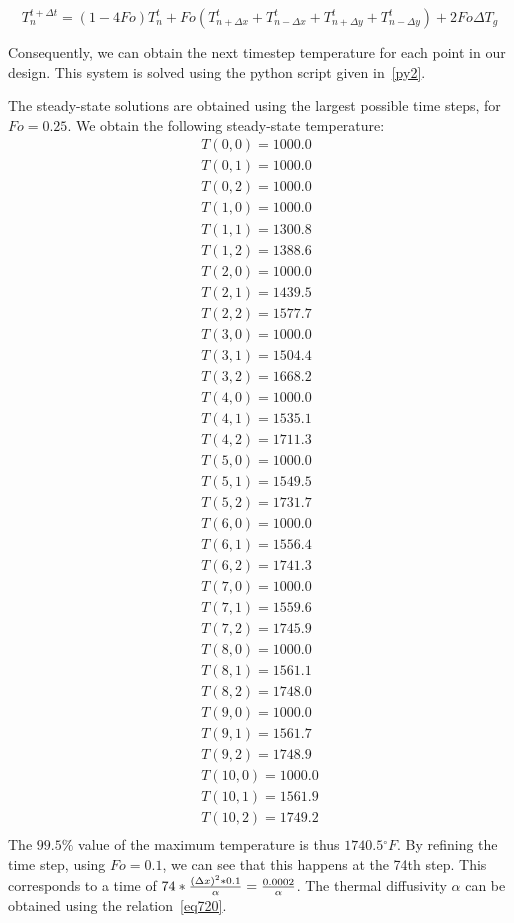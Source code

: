 \begin{equation}\label{eq718}
T_n^{t+\Delta t} = (1-4Fo)T_n^t + Fo(T_{n+\Delta x}^t + T_{n-\Delta x}^t + T_{n+\Delta y}^t + T_{n-\Delta y}^t) + 2Fo\Delta T_g
\end{equation}

Consequently, we can obtain the next timestep temperature for each point in our design. This system is solved using the python script given in~\ref{py2}.

The steady-state solutions are obtained using the largest possible time steps, for $Fo=0.25$. We obtain the following steady-state temperature:
\tiny
\begin{equation}\label{eq719}
\begin{aligned}
T(0,0) = 1000.0\\
T(0,1) = 1000.0\\
T(0,2) = 1000.0\\
T(1,0) = 1000.0\\
T(1,1) = 1300.8\\
T(1,2) = 1388.6\\
T(2,0) = 1000.0\\
T(2,1) = 1439.5\\
T(2,2) = 1577.7\\
T(3,0) = 1000.0\\
T(3,1) = 1504.4\\
T(3,2) = 1668.2\\
T(4,0) = 1000.0\\
T(4,1) = 1535.1\\
T(4,2) = 1711.3\\
T(5,0) = 1000.0\\
T(5,1) = 1549.5\\
T(5,2) = 1731.7\\
T(6,0) = 1000.0\\
T(6,1) = 1556.4\\
T(6,2) = 1741.3\\
T(7,0) = 1000.0\\
T(7,1) = 1559.6\\
T(7,2) = 1745.9\\
T(8,0) = 1000.0\\
T(8,1) = 1561.1\\
T(8,2) = 1748.0\\
T(9,0) = 1000.0\\
T(9,1) = 1561.7\\
T(9,2) = 1748.9\\
T(10,0) = 1000.0\\
T(10,1) = 1561.9\\
T(10,2) = 1749.2\\
\end{aligned}
\end{equation}
\normalsize
The $99.5\%$ value of the maximum temperature is thus $1740.5{}^\circ F$. By refining the time step, using $Fo=0.1$, we can see that this happens at the 74th step. This corresponds to a time of $74 * \frac{(\Delta x)^2 * 0.1}{\alpha} = \frac{\text{\num{0.0002}}}{\alpha}$. The thermal diffusivity $\alpha$ can be obtained using the relation~\ref{eq720}.

